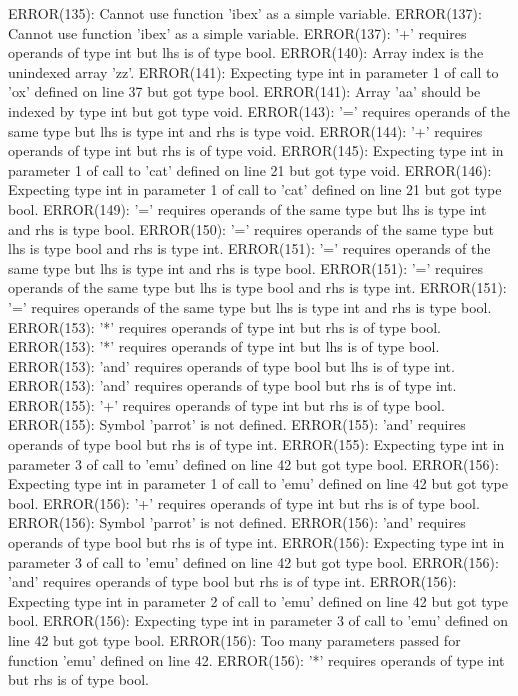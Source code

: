 \documentclass[12pt]{book}
\begin{document}
ERROR(135): Cannot use function 'ibex' as a simple variable.
ERROR(137): Cannot use function 'ibex' as a simple variable.
ERROR(137): '+' requires operands of type int but lhs is of type bool.
ERROR(140): Array index is the unindexed array 'zz'.
ERROR(141): Expecting type int in parameter 1 of call to 'ox' defined on line 37 but got type bool.
ERROR(141): Array 'aa' should be indexed by type int but got type void.
ERROR(143): '=' requires operands of the same type but lhs is type int and rhs is type void.
ERROR(144): '+' requires operands of type int but rhs is of type void.
ERROR(145): Expecting type int in parameter 1 of call to 'cat' defined on line 21 but got type void.
ERROR(146): Expecting type int in parameter 1 of call to 'cat' defined on line 21 but got type bool.
ERROR(149): '=' requires operands of the same type but lhs is type int and rhs is type bool.
ERROR(150): '=' requires operands of the same type but lhs is type bool and rhs is type int.
ERROR(151): '=' requires operands of the same type but lhs is type int and rhs is type bool.
ERROR(151): '=' requires operands of the same type but lhs is type bool and rhs is type int.
ERROR(151): '=' requires operands of the same type but lhs is type int and rhs is type bool.
ERROR(153): '*' requires operands of type int but rhs is of type bool.
ERROR(153): '*' requires operands of type int but lhs is of type bool.
ERROR(153): 'and' requires operands of type bool but lhs is of type int.
ERROR(153): 'and' requires operands of type bool but rhs is of type int.
ERROR(155): '+' requires operands of type int but rhs is of type bool.
ERROR(155): Symbol 'parrot' is not defined.
ERROR(155): 'and' requires operands of type bool but rhs is of type int.
ERROR(155): Expecting type int in parameter 3 of call to 'emu' defined on line 42 but got type bool.
ERROR(156): Expecting type int in parameter 1 of call to 'emu' defined on line 42 but got type bool.
ERROR(156): '+' requires operands of type int but rhs is of type bool.
ERROR(156): Symbol 'parrot' is not defined.
ERROR(156): 'and' requires operands of type bool but rhs is of type int.
ERROR(156): Expecting type int in parameter 3 of call to 'emu' defined on line 42 but got type bool.
ERROR(156): 'and' requires operands of type bool but rhs is of type int.
ERROR(156): Expecting type int in parameter 2 of call to 'emu' defined on line 42 but got type bool.
ERROR(156): Expecting type int in parameter 3 of call to 'emu' defined on line 42 but got type bool.
ERROR(156): Too many parameters passed for function 'emu' defined on line 42.
ERROR(156): '*' requires operands of type int but rhs is of type bool.
\end{document}
